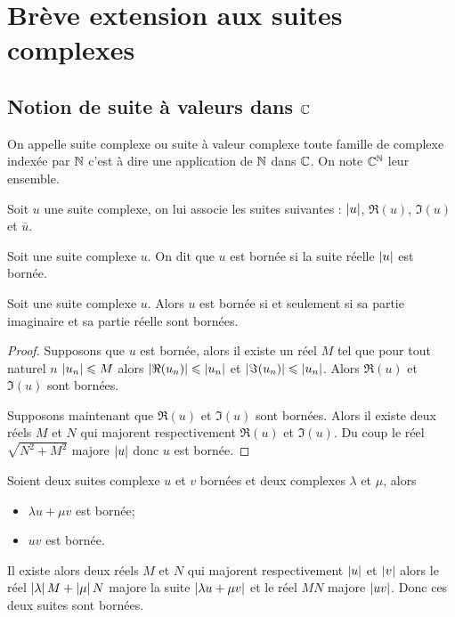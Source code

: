 \section{Brève extension aux suites complexes}

\subsection{Notion de suite à valeurs dans $\mathbb{C}$}

\begin{defdef}
  On appelle suite complexe ou suite à valeur complexe toute famille de complexe indexée par $\mathbb{N}$ c'est à dire une application de $\mathbb{N}$ dans $\mathbb{C}$. On note $\mathbb{C}^{\mathbb{N}}$ leur ensemble.
\end{defdef}
\begin{defdef}
  Soit $u$ une suite complexe, on lui associe les suites suivantes : $\left\lvert u\right\rvert$, $\Re(u)$, $\Im(u)$ et $\bar{u}$.
\end{defdef}
\begin{defdef}
  Soit une suite complexe $u$. On dit que $u$ est bornée si la suite réelle $\left\lvert u\right\rvert$ est bornée.
\end{defdef}

\begin{prop}
  Soit une suite complexe $u$. Alors $u$ est bornée si et seulement si sa partie imaginaire et sa partie réelle sont bornées.
\end{prop}
\begin{proof}
  Supposons que $u$ est bornée, alors il existe un réel $M$ tel que pour tout naturel $n$ $\left\lvert u_n\right\rvert \leqslant M$ alors $\left\lvert\Re(u_n)\right\rvert \leqslant \left\lvert u_n\right\rvert$ et $\left\lvert\Im(u_n)\right\rvert \leqslant \left\lvert u_n\right\rvert$. Alors $\Re(u)$ et $\Im(u)$ sont bornées.

Supposons maintenant que $\Re(u)$ et $\Im(u)$ sont bornées. Alors il existe deux réels $M$ et $N$ qui majorent respectivement $\Re(u)$ et $\Im(u)$. Du coup le réel $\sqrt{N^2+M^2}$ majore $\left\lvert u\right\rvert$ donc $u$ est bornée.
\end{proof}

\begin{prop}
  Soient deux suites complexe $u$ et $v$ bornées et deux complexes $\lambda$ et $\mu$, alors
  \begin{itemize}
  \item $\lambda u + \mu v$ est bornée;
  \item $uv$ est bornée.
  \end{itemize}
Il existe alors deux réels $M$ et $N$ qui majorent respectivement $\left\lvert u\right\rvert$ et $\left\lvert v\right\rvert$ alors le réel $\left\lvert\lambda\right\rvert M+\left\lvert\mu\right\rvert N$ majore la suite $\left\lvert\lambda u + \mu v\right\rvert$ et le réel $MN$ majore $\left\lvert uv\right\rvert$. Donc ces deux suites sont bornées.
\end{prop}

